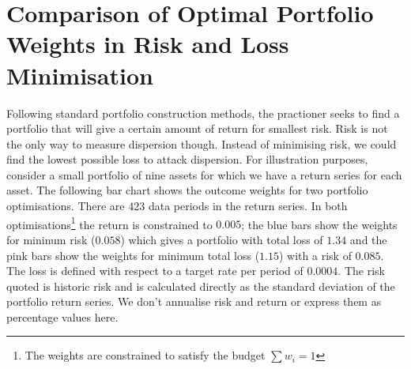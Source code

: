 \documentclass[12pt]{article}
\begin{document}
\section{Comparison of Optimal Portfolio Weights in Risk and Loss Minimisation}

Following standard portfolio construction methods, the practioner seeks to find a portfolio that 
will give a certain amount of return for smallest risk. Risk is not the only way to measure 
dispersion though. Instead of minimising risk, we could find the 
lowest possible loss to attack dispersion. For illustration purposes, consider a small portfolio of nine assets
for which we have a return series for each asset.
The following bar chart shows the outcome weights for two portfolio optimisations. There are $423$ data periods in the
return series. In both optimisations\footnote{The weights are constrained to satisfy the budget $\sum w_i = 1$} the return is 
constrained to $0.005$; the blue bars show the weights
for mininum risk ($0.058$) which gives a portfolio with total loss of $1.34$ and the pink bars show
the weights for minimum total loss ($1.15$) with a risk of $0.085$. The loss is defined with respect to a target rate per period of 
$0.0004$. The risk quoted is historic risk and is 
calculated directly as the standard deviation of the portfolio return series. We don't annualise risk and return or 
express them as percentage values here.

\pagebreak
{}
\end{document}
